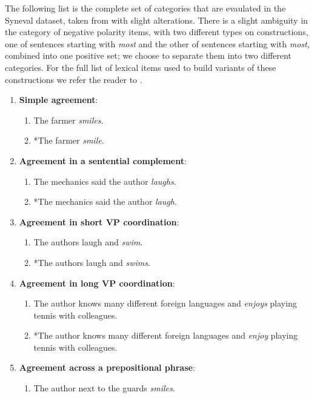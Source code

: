 The following list is the complete set of categories that are evaulated in the Syneval dataset, taken from \citet{linzen2018targeted} with slight alterations. There is a slight ambiguity in the category of negative polarity items, with two different types on constructions, one of sentences starting with \textit{most} and the other of sentences starting with \textit{most}, combined into one positive set; we choose to separate them into two different categories. For the full list of lexical items used to build variants of these constructions we refer the reader to \citet{linzen2018targeted}.

\begin{enumerate}[noitemsep]
  \item \textbf{Simple agreement}:
    \begin{enumerate}
      \item The farmer \textit{smiles}.
      \item *The farmer \textit{smile}.
    \end{enumerate}
  \item \textbf{Agreement in a sentential complement}:
    \begin{enumerate}
      \item The mechanics said the author \textit{laughs}.
      \item *The mechanics said the author \textit{laugh}.
    \end{enumerate}
  \item \textbf{Agreement in short VP coordination}:
    \begin{enumerate}
      \item The authors laugh and \textit{swim}.
      \item *The authors laugh and \textit{swims}.
    \end{enumerate}
  \item \textbf{Agreement in long VP coordination}:
    \begin{enumerate}
      \item The author knows many different foreign languages and \textit{enjoys} playing tennis with colleagues.
      \item *The author knows many different foreign languages and \textit{enjoy} playing tennis with colleagues.
    \end{enumerate}
  \item \textbf{Agreement across a prepositional phrase}:
    \begin{enumerate}
      \item The author next to the guards \textit{smiles}.

\end{enumerate}
\end{enumerate}
